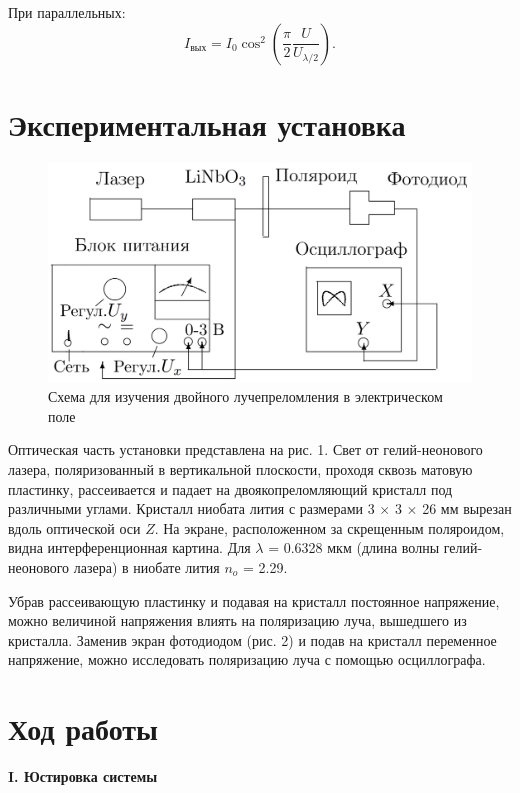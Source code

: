 \documentclass[12pt,a4paper]{article}
\begin{document}
	При параллельных:
	\begin{equation*}
		I_{\text{вых}} = I_0\cos^2\left(\frac{\pi}{2}\frac{U}{U_{\lambda / 2}}\right).
	\end{equation*}

	\newpage

	\section*{Экспериментальная установка}
	\begin{figure}[h!]
		\centering
		\includegraphics[width=\linewidth]{res/oscilloscope}
		\caption{Схема для изучения двойного лучепреломления в электрическом поле}
	\end{figure}

	Оптическая часть установки представлена на рис. 1. Свет от гелий-неонового лазера, поляризованный в вертикальной плоскости, проходя сквозь матовую пластинку, рассеивается и падает на двоякопреломляющий кристалл под различными углами. Кристалл ниобата лития с размерами 3 $\times$ 3 $\times$ 26 мм вырезан вдоль оптической оси $Z$. На экране, расположенном за скрещенным поляроидом, видна интерференционная картина. Для $\lambda$ = 0.6328 мкм (длина волны гелий-неонового лазера) в ниобате лития $n_o$ = 2.29.
	
	Убрав рассеивающую пластинку и подавая на кристалл постоянное напряжение, можно величиной напряжения влиять на поляризацию луча, вышедшего из кристалла.
	Заменив экран фотодиодом (рис. 2) и подав на кристалл переменное напряжение, можно исследовать поляризацию луча с помощью осциллографа.

    \section*{Ход работы}
    
    \begin{center}
		\textbf{I. Юстировка системы}
	\end{center}
	
\end{document}
